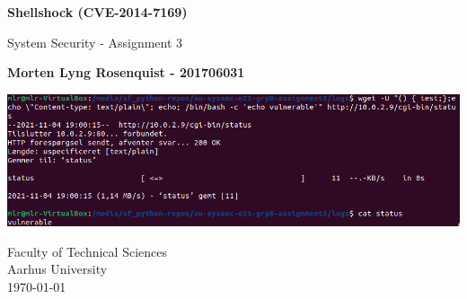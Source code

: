 \begin{titlepage}
    \begin{center}
        \vspace*{1cm}
            
        \Huge
        \textbf{Shellshock (CVE-2014-7169)}
            
        \vspace{0.5cm}
        \LARGE
        System Security - Assignment 3
            
        \vspace{1.5cm}
            
        \textbf{Morten Lyng Rosenquist - 201706031}
            
        \vfill
        \includegraphics[width=1.0\textwidth]{../pictures/echo-vulnerable.png}    
            
        \vspace{0.8cm}
            

            
        \Large
        Faculty of Technical Sciences\\
        Aarhus University\\
        \today
            
    \end{center}
\end{titlepage}